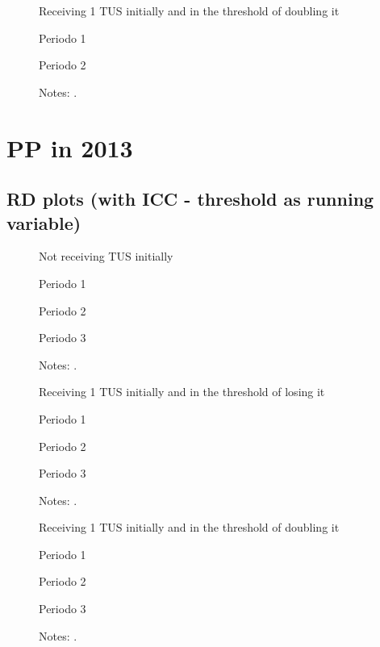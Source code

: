 \documentclass[12pt]{article}
\begin{document}
\begin{figure}[H]%
	\caption{Receiving 1 TUS initially and in the threshold of doubling it}%
	\centering
	\caption*{ {Periodo 1}}
	\qquad
	\caption*{Periodo 2}
	\label{fig:pp2016_seg_2TUS.png}%
	\caption*{ {\footnotesize Notes: .}}
\end{figure}


\section{PP in 2013}

\subsection{RD plots (with ICC - threshold as running variable)}
\begin{figure}[H]%
	\caption{Not receiving TUS initially}%
	\centering
	\caption*{ {Periodo 1}}
	\caption*{Periodo 2}
	\qquad
	\caption*{Periodo 3}
	\label{fig:pp2013_prim_0TUS.png}%
	\caption*{ {\footnotesize Notes: .}}
\end{figure}

\begin{figure}[H]%
	\caption{Receiving 1 TUS initially and in the threshold of losing it}%
	\centering
	\caption*{ {Periodo 1}}
	\qquad
	\caption*{Periodo 2}
	\qquad
	\caption*{Periodo 3}
	\label{fig:pp2013_prim_1TUS.png}%
	\caption*{ {\footnotesize Notes: .}}
\end{figure}

\begin{figure}[H]%
	\caption{Receiving 1 TUS initially and in the threshold of doubling it}%
	\centering
	\caption*{ {Periodo 1}}
	\qquad
	\caption*{Periodo 2}
	\qquad
	\caption*{Periodo 3}
	\label{fig:pp2013_seg_1TUS.png}%
	\caption*{ {\footnotesize Notes: .}}
\end{figure}
\end{document}
